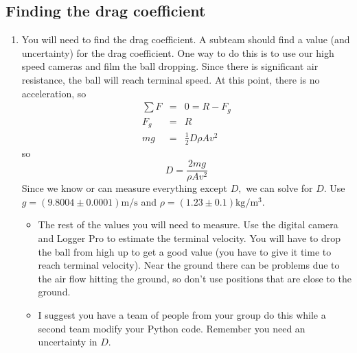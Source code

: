 \documentclass[twoside,11pt,ShortChapTitles]{BYUTextbook}
\begin{document}
\subsection{Finding the drag coefficient}
\begin{enumerate}
\item You will need to find the drag coefficient. A subteam should find a
value (and uncertainty) for the drag coefficient. One way to do this is to
use our high speed cameras and film the ball dropping. Since there is
significant air resistance, the ball will reach terminal speed. At this
point, there is no acceleration, so
\begin{eqnarray*}
\sum F &=&0=R-F_{g} \\
F_{g} &=&R \\
mg &=&\frac{1}{2}D\rho Av^{2}
\end{eqnarray*}%
so%
\[
D=\frac{2mg}{\rho Av^{2}}
\]%
Since we know or can measure everything except $D,$ we can solve for $D.$
Use $g=\left( 9.8004\pm 0.0001\right) \text{m}/\text{s}$ and $\rho =\left(
1.23\pm 0.1\right) \text{kg}/\text{m}^{3}.$

\begin{itemize}
\item The rest of the values you will need to measure. Use the digital
camera and Logger Pro to estimate the terminal velocity. You will have to
drop the ball from high up to get a good value (you have to give it time to
reach terminal velocity). Near the ground there can be problems due to the
air flow hitting the ground, so don't use positions that are close to the
ground.

\item I suggest you have a team of people from your group do this while a
second team modify your Python code. Remember you need an uncertainty in $D.$
\end{itemize}
\end{enumerate}
\end{document}
